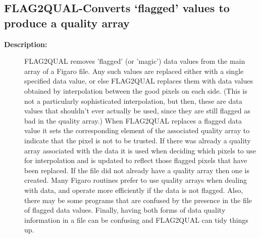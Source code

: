 \subsection{FLAG2QUAL-\label{FLAG2QUAL}Converts `flagged' values to produce a quality array}
\begin{description}

\item [{\bf Description:}]
 FLAG2QUAL removes 'flagged' (or 'magic') data values from the main
 array of a Figaro file. Any such values are replaced either with a
 single specified data value, or else FLAG2QUAL replaces them with
 data values obtained by interpolation between the good pixels on
 each side. (This is not a particularly sophisticated interpolation,
 but then, these are data values that shouldn't ever actually be
 used, since they are still flagged as bad in the quality array.)
 When FLAG2QUAL replaces a flagged data value it sets the
 corresponding element of the associated quality array to indicate
 that the pixel is not to be trusted. If there was already a quality
 array associated with the data it is used when deciding which pixels
 to use for interpolation and is updated to reflect those flagged
 pixels that have been replaced.  If the file did not already have a
 quality array then one is created. Many Figaro routines prefer to
 use quality arrays when dealing with data, and operate more
 efficiently if the data is not flagged. Also, there may be some
 programs that are confused by the presence in the file of flagged
 data values. Finally, having both forms of data quality information
 in a file can be confusing and FLAG2QUAL can tidy things up.


\end{description}

